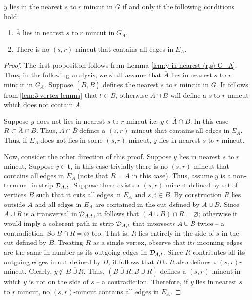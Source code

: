 \begin{lemma}

\label{lem:y-in-nearest-r-s-mincut}
$y$ lies in the nearest $s$ to $r$ mincut in $G$ if and only if the following conditions hold:

\begin{enumerate}
    \item ${\overline A}$ lies in nearest $s$ to $r$ mincut in $G_A$.
    \item There is no $(s,r)$-mincut that contains all edges in $E_A$.
\end{enumerate}
\end{lemma}
\begin{proof}
The first proposition follows from Lemma \ref{lem:y-in-nearest-(r,s)-G_A}. Thus, in the following analysis, we shall assume that ${\overline A}$ lies in nearest $s$ to $r$ mincut in $G_A$. Suppose $({\overline B},B)$ defines the nearest $s$ to $r$ mincut in $G$. It follows from \ref{lem:3-vertex-lemma} that $t\in {\overline B}$, otherwise $A\cap {\overline B}$ will define a $s$ to $r$ mincut which does not contain ${\overline A}$. 

Suppose $y$ does not lies in nearest $s$ to $r$ mincut i.e. $y \in {\overline A} \cap B$. In this case $R \subset {\overline A} \cap B$. Thus, $A\cap {\overline B}$ defines a $(s,r)$-mincut that contains all edges in $E_A$. Thus, if $E_A$ does not lies in some $(s,r)$-mincut, $y$ lies in nearest $s$ to $r$ mincut.

Now, consider the other direction of this proof. Suppose $y$ lies in nearest $s$ to $r$ mincut. Suppose $y \in \mathbf{t}$, in this case trivially there is no $(s,r)$-mincut that contains all edges in $E_A$ (note that $R = {\overline A}$ in this case). Thus, assume $y$ is a non-terminal in strip ${\cal D}_{A,t}$. Suppose there exists a $(s,r)$-mincut defined by set of vertices $B$ such that it cuts all edges in $E_A$ and $s,t \in {\overline B}$. By construction $R$ lies outside $A$ and all edges in $E_A$ are contained in the cut defined by $A\cup {B}$. Since $A\cup {B}$ is a transversal in ${\cal D}_{A,t}$, it follows that $(A\cup {B}) \cap R = \varnothing$; otherwise it would imply a coherent path in strip ${\cal D}_{A,t}$ that intersects $A \cup {B}$ twice -- a contradiction. So $B\cap R = \varnothing$ too. That is, $R$ lies entirely in the side of $s$ in the cut defined by $B$. Treating $R$ as a single vertex, observe that its incoming edges are the same in number as its outgoing edges in ${\cal D}_{A,t}$. Since $R$ contributes all its outgoing edges in cut defined by $B$, it follows that $B\cup R$ also defines a $(s,r)$-mincut. Clearly, $y \not\in {\overline {B \cup R}}$. Thus, $(\overline{B\cup R}, B\cup R)$ defines a $(s,r)$-mincut in which $y$ is not on the side of $s$ -- a contradiction. Therefore, if $y$ lies in nearest $s$ to $r$ mincut, no $(s,r)$-mincut contains all edges in $E_A$.

\end{proof}

